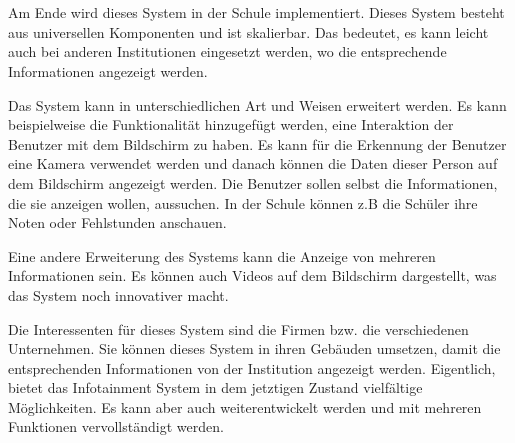 \chapter{\docname}
\label{\docname}
Am Ende wird dieses System in der Schule implementiert. Dieses System besteht aus universellen Komponenten und ist skalierbar. Das bedeutet, es kann leicht auch bei anderen Institutionen eingesetzt werden, wo die entsprechende Informationen angezeigt werden. 

Das System kann in unterschiedlichen Art und Weisen erweitert werden. Es kann beispielweise die Funktionalit\"at hinzugef\"ugt werden, eine Interaktion der Benutzer mit dem Bildschirm zu haben. Es kann f\"ur die Erkennung der Benutzer eine Kamera verwendet werden und danach k\"onnen die Daten dieser Person auf dem Bildschirm angezeigt werden. Die Benutzer sollen selbst die Informationen, die sie anzeigen wollen, aussuchen. In der Schule k\"onnen z.B die Sch\"uler ihre Noten oder Fehlstunden anschauen. 

Eine andere Erweiterung des Systems kann die Anzeige von mehreren Informationen sein. Es k\"onnen auch Videos auf dem Bildschirm dargestellt, was das System noch innovativer macht. 

Die Interessenten f\"ur dieses System sind die Firmen bzw. die verschiedenen Unternehmen. Sie k\"onnen dieses System in ihren Geb\"auden umsetzen, damit die entsprechenden Informationen von der Institution angezeigt werden. 
Eigentlich, bietet das Infotainment System in dem jetztigen Zustand vielf\"altige M\"oglichkeiten. Es kann aber auch weiterentwickelt werden und mit mehreren Funktionen vervollst\"andigt werden.

